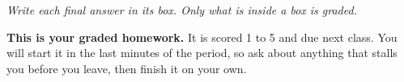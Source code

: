 \documentclass[12pt]{article}
\begin{document}
{\small\itshape Write each final answer in its box. Only what is inside a box is graded.}\par

\vspace{0.15in}

\boxguard[8]
\begin{remindbox}
\small
\textbf{This is your graded homework.} It is scored 1 to 5 and due next class. You will start it in the
last minutes of the period, so ask about anything that stalls you before you leave, then finish
it on your own.
\end{remindbox}

\vspace{0.12in}
\end{document}
